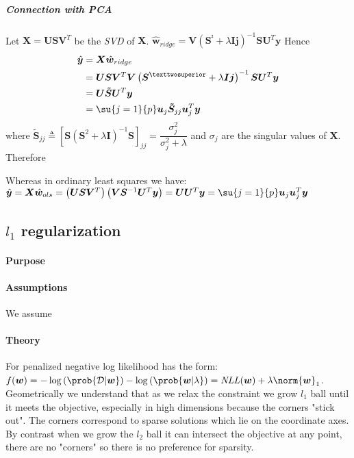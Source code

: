 \subparagraph{Connection with PCA}
Let $\bm{X} = \bm{USV}^{T}$ be the \emph{SVD} of $\bm{X}$.
$\hat{\bm{w}}_{ridge} = \bm{V}\left(\bm{S}^{²} +\lambda\bm{Ij}\right)^{-1}\bm{SU}^{T}\bm{y}$
Hence 
\begin{align*}
    \hat{\bm{y}} &= \bm{X}\hat{\bm{w}}_{ridge}\\
                 &= \bm{USV}^{T}\bm{V}\left(\bm{S}^{²} +\lambda\bm{Ij}\right)^{-1}\bm{SU}^{T}\bm{y}\\
                 &= \bm{U\tilde{S}U}^{T}\bm{y}\\
                 &= \su{j=1}{p}\bm{u}_{j}\bm{\tilde{S}}_{jj}\bm{u}_{j}^{T}\bm{y}
\end{align*}
where $\bm{\tilde{S}}_{jj}
\triangleq \left[\bm{S}\left(\bm{S}^{2} + \lambda\bm{I}\right)^{-1}\bm{S}\right]_{jj} = 
\dfrac{\sigma_{j}^{2}}{\sigma_{j}^{2} + \lambda}$ and $\sigma_{j}$ are the singular values of 
$\bm{X}$.
Therefore 
\begin{center}
\end{center}
Whereas in ordinary least squares we have:
$\hat{\bm{y}} = \bm{X}\hat{\bm{w}}_{ols} = \left(\bm{USV}^{T}\right)\left(\bm{VS}^{-1}\bm{U}^{T}
\bm{y}\right) = \bm{UU}^{T}\bm{y}=\su{j=1}{p}\bm{u}_{j}\bm{u}_{j}^{T}\bm{y}$


\subsection{$l_{1}$ regularization}
\paragraph{Purpose}

\paragraph{Assumptions}
We assume 
\paragraph{Theory}
For penalized negative log likelihood has the form: $f(\bm{w}) = -\log\left(\prob{
\mathcal{D}|\bm{w}}\right) - \log\left(\prob{\bm{w}|\lambda}\right) = \text{\emph{NLL}}
(\bm{w}) + \lambda\norm{\bm{w}}_{1}$.\\
Geometrically we understand that as we relax the constraint we grow $l_{1}$ ball until
it meets the objective,  especially in high dimensions because the corners "stick
out". The corners correspond to sparse solutions which lie on the coordinate axes. By
contrast when we grow the $l_{2}$ ball it can intersect the objective at any point, 
there are no "corners" so there is no preference for sparsity. 
